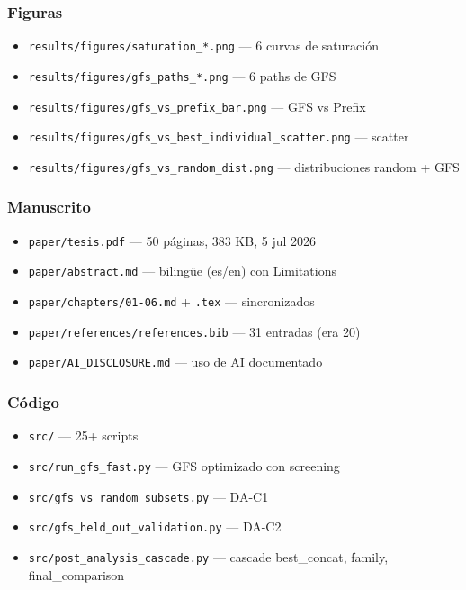 \subsubsection{Figuras}
\begin{itemize}
  \item \texttt{results/figures/saturation\_*.png} --- 6 curvas de saturación
  \item \texttt{results/figures/gfs\_paths\_*.png} --- 6 paths de GFS
  \item \texttt{results/figures/gfs\_vs\_prefix\_bar.png} --- GFS vs Prefix
  \item \texttt{results/figures/gfs\_vs\_best\_individual\_scatter.png} --- scatter
  \item \texttt{results/figures/gfs\_vs\_random\_dist.png} --- distribuciones random + GFS
\end{itemize}

\subsubsection{Manuscrito}
\begin{itemize}
  \item \texttt{paper/tesis.pdf} --- 50 páginas, 383 KB, 5 jul 2026
  \item \texttt{paper/abstract.md} --- bilingüe (es/en) con Limitations
  \item \texttt{paper/chapters/01-06.md} + \texttt{.tex} --- sincronizados
  \item \texttt{paper/references/references.bib} --- 31 entradas (era 20)
  \item \texttt{paper/AI\_DISCLOSURE.md} --- uso de AI documentado
\end{itemize}

\subsubsection{Código}
\begin{itemize}
  \item \texttt{src/} --- 25+ scripts
  \item \texttt{src/run\_gfs\_fast.py} --- GFS optimizado con screening
  \item \texttt{src/gfs\_vs\_random\_subsets.py} --- DA-C1
  \item \texttt{src/gfs\_held\_out\_validation.py} --- DA-C2
  \item \texttt{src/post\_analysis\_cascade.py} --- cascade best\_concat, family, final\_comparison
\end{itemize}

